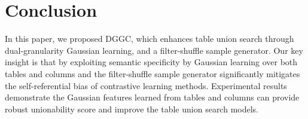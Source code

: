 \section{Conclusion}
\label{cld}
In this paper, we proposed DGGC, which enhances table union search through dual-granularity Gaussian learning,
and a filter-shuffle sample generator. Our key insight is that by 
exploiting semantic specificity by Gaussian learning over both tables and columns and the filter-shuffle sample generator significantly mitigates the self-referential bias of contrastive learning methods. Experimental results demonstrate the Gaussian features learned from tables and columns can provide robust unionability score and improve the table union search models.
